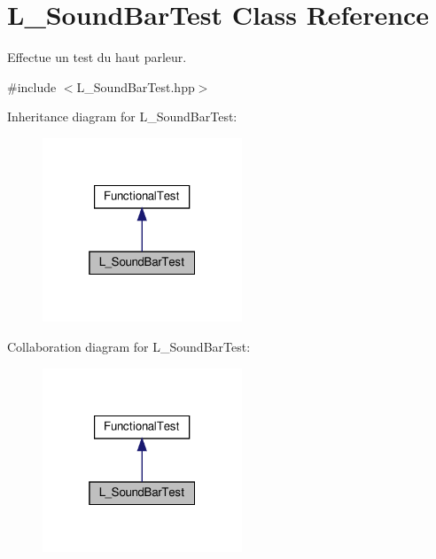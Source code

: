 \hypertarget{classL__SoundBarTest}{}\section{L\+\_\+\+Sound\+Bar\+Test Class Reference}
\label{classL__SoundBarTest}


Effectue un test du haut parleur.  




{\ttfamily \#include $<$L\+\_\+\+Sound\+Bar\+Test.\+hpp$>$}



Inheritance diagram for L\+\_\+\+Sound\+Bar\+Test\+:
\nopagebreak
\begin{figure}[H]
\begin{center}
\leavevmode
\includegraphics[width=169pt]{classL__SoundBarTest__inherit__graph}
\end{center}
\end{figure}


Collaboration diagram for L\+\_\+\+Sound\+Bar\+Test\+:
\nopagebreak
\begin{figure}[H]
\begin{center}
\leavevmode
\includegraphics[width=169pt]{classL__SoundBarTest__coll__graph}
\end{center}
\end{figure}
